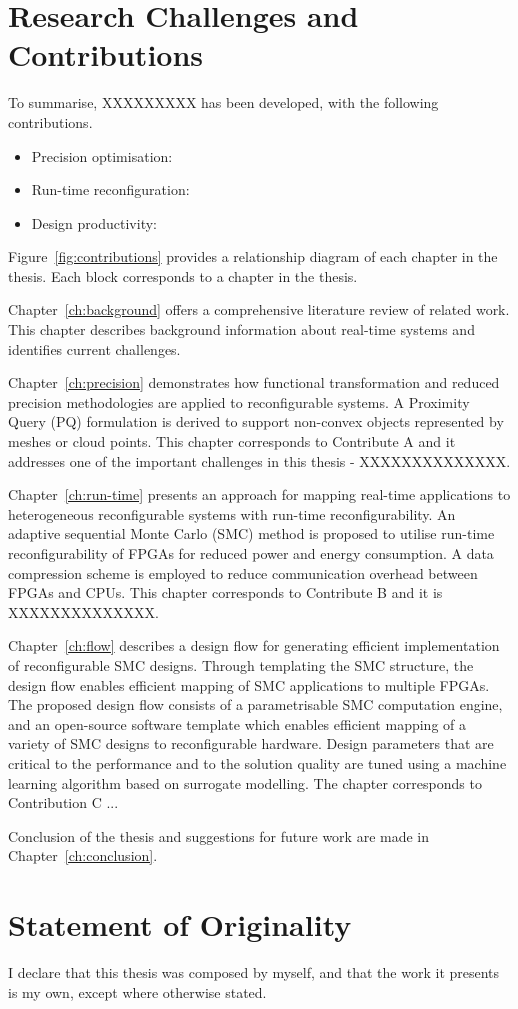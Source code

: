 \section{Research Challenges and Contributions}

To summarise, XXXXXXXXX has been developed, with the following contributions.

\begin{itemize}
\item Precision optimisation: 
\item Run-time reconfiguration: 
\item Design productivity:  
\end{itemize}

Figure~\ref{fig:contributions} provides a relationship diagram of each chapter in the thesis.
Each block corresponds to a chapter in the thesis.

Chapter~\ref{ch:background} offers a comprehensive literature review of related work.
This chapter describes background information about real-time systems and identifies current challenges.

Chapter~\ref{ch:precision} demonstrates how functional transformation and reduced precision methodologies are applied to reconfigurable systems.
A Proximity Query (PQ) formulation is derived to support non-convex objects represented by meshes or cloud points. 
This chapter corresponds to Contribute A and it addresses one of the important challenges in this thesis - XXXXXXXXXXXXXX.

Chapter~\ref{ch:run-time} presents an approach for mapping real-time applications to heterogeneous reconfigurable systems with run-time reconfigurability.
An adaptive sequential Monte Carlo (SMC) method is proposed to utilise run-time reconfigurability of FPGAs for reduced power and energy consumption. 
A data compression scheme is employed to reduce communication overhead between FPGAs and CPUs.
This chapter corresponds to Contribute B and it is XXXXXXXXXXXXXX.

Chapter~\ref{ch:flow} describes a design flow for generating efficient implementation of reconfigurable SMC designs. 
Through templating the SMC structure, the design flow enables efficient mapping of SMC applications to multiple FPGAs.
The proposed design flow consists of a parametrisable SMC computation engine, and an open-source software template which enables efficient mapping of a variety of SMC designs to reconfigurable hardware.
Design parameters that are critical to the performance and to the solution quality are tuned using a machine learning algorithm based on surrogate modelling.
The chapter corresponds to Contribution C ...

Conclusion of the thesis and suggestions for future work are made in Chapter~\ref{ch:conclusion}.

\section{Statement of Originality}

I declare that this thesis was composed by myself, and that the work it presents is my own, except where otherwise stated.

